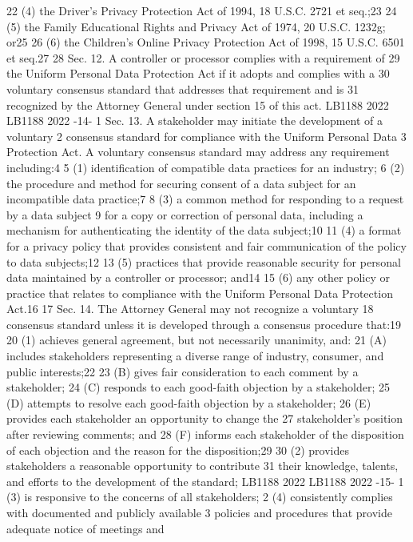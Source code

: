 22 (4) the Driver's Privacy Protection Act of 1994, 18 U.S.C. 2721 et
seq.;23
24 (5) the Family Educational Rights and Privacy Act of 1974, 20 U.S.C.
1232g; or25
26 (6) the Children's Online Privacy Protection Act of 1998, 15 U.S.C.
6501 et seq.27
28 Sec. 12. A controller or processor complies with a requirement of
29 the Uniform Personal Data Protection Act if it adopts and complies with a
30 voluntary consensus standard that addresses that requirement and is
31 recognized by the Attorney General under section 15 of this act.
LB1188
2022
LB1188
2022
-14-
1 Sec. 13. A stakeholder may initiate the development of a voluntary
2 consensus standard for compliance with the Uniform Personal Data
3 Protection Act. A voluntary consensus standard may address any
requirement including:4
5 (1) identification of compatible data practices for an industry;
6 (2) the procedure and method for securing consent of a data subject
for an incompatible data practice;7
8 (3) a common method for responding to a request by a data subject
9 for a copy or correction of personal data, including a mechanism for
authenticating the identity of the data subject;10
11 (4) a format for a privacy policy that provides consistent and fair
communication of the policy to data subjects;12
13 (5) practices that provide reasonable security for personal data
maintained by a controller or processor; and14
15 (6) any other policy or practice that relates to compliance with the
Uniform Personal Data Protection Act.16
17 Sec. 14. The Attorney General may not recognize a voluntary
18 consensus standard unless it is developed through a consensus procedure
that:19
20 (1) achieves general agreement, but not necessarily unanimity, and:
21 (A) includes stakeholders representing a diverse range of industry,
consumer, and public interests;22
23 (B) gives fair consideration to each comment by a stakeholder;
24 (C) responds to each good-faith objection by a stakeholder;
25 (D) attempts to resolve each good-faith objection by a stakeholder;
26 (E) provides each stakeholder an opportunity to change the
27 stakeholder's position after reviewing comments; and
28 (F) informs each stakeholder of the disposition of each objection
and the reason for the disposition;29
30 (2) provides stakeholders a reasonable opportunity to contribute
31 their knowledge, talents, and efforts to the development of the standard;
LB1188
2022
LB1188
2022
-15-
1 (3) is responsive to the concerns of all stakeholders;
2 (4) consistently complies with documented and publicly available
3 policies and procedures that provide adequate notice of meetings and

